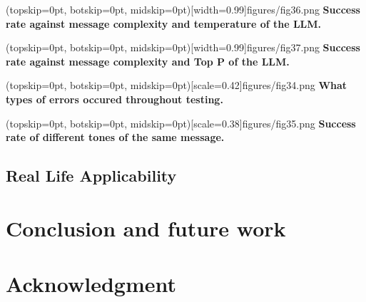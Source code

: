 \documentclass{ieeeaccess}
\begin{document}

\Figure[t!](topskip=0pt, botskip=0pt,
midskip=0pt)[width=0.99\columnwidth]{{figures/fig36.png}}
{ \textbf{Success rate against message complexity and temperature of the LLM.}\label{fig10}}

\Figure[t!](topskip=0pt, botskip=0pt,
midskip=0pt)[width=0.99\columnwidth]{{figures/fig37.png}}
{ \textbf{Success rate against message complexity and Top P of the LLM.}\label{fig11}}

\Figure[t!](topskip=0pt, botskip=0pt,
midskip=0pt)[scale=0.42]{{figures/fig34.png}}
{ \textbf{What types of errors occured throughout testing.}\label{fig12}}

\Figure[t!](topskip=0pt, botskip=0pt,
midskip=0pt)[scale=0.38]{{figures/fig35.png}}
{ \textbf{Success rate of different tones of the same message.}\label{fig13}}

\subsection{Real Life Applicability}

\section{Conclusion and future work}
\label{sec:conclusion}

\section*{Acknowledgment}




\end{document}
